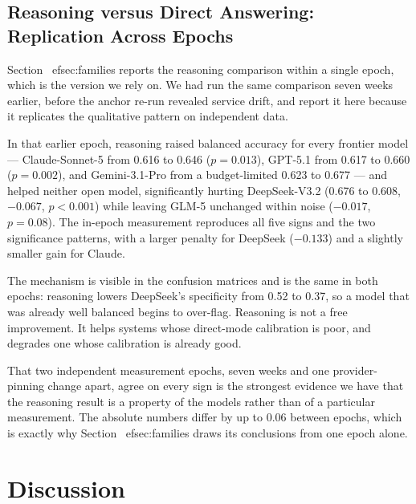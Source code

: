 \documentclass[computers,article,submit,moreauthors]{Definitions/mdpi}
\begin{document}
\subsection{Reasoning versus Direct Answering: Replication Across Epochs}\label{sec:reasoning}
Section~
ef{sec:families} reports the reasoning comparison within a single epoch, which is the version we rely on. We had run the same comparison seven weeks earlier, before the anchor re-run revealed service drift, and report it here because it replicates the qualitative pattern on independent data.

In that earlier epoch, reasoning raised balanced accuracy for every frontier model --- Claude-Sonnet-5 from 0.616 to 0.646 ($p=0.013$), GPT-5.1 from 0.617 to 0.660 ($p=0.002$), and Gemini-3.1-Pro from a budget-limited 0.623 to 0.677 --- and helped neither open model, significantly hurting DeepSeek-V3.2 (0.676 to 0.608, $-0.067$, $p<0.001$) while leaving GLM-5 unchanged within noise ($-0.017$, $p=0.08$). The in-epoch measurement reproduces all five signs and the two significance patterns, with a larger penalty for DeepSeek ($-0.133$) and a slightly smaller gain for Claude.

The mechanism is visible in the confusion matrices and is the same in both epochs: reasoning lowers DeepSeek's specificity from 0.52 to 0.37, so a model that was already well balanced begins to over-flag. Reasoning is not a free improvement. It helps systems whose direct-mode calibration is poor, and degrades one whose calibration is already good.

That two independent measurement epochs, seven weeks and one provider-pinning change apart, agree on every sign is the strongest evidence we have that the reasoning result is a property of the models rather than of a particular measurement. The absolute numbers differ by up to 0.06 between epochs, which is exactly why Section~
ef{sec:families} draws its conclusions from one epoch alone.

\section{Discussion}\label{sec:discussion}
\end{document}

